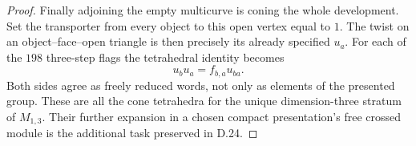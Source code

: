 \begin{proof}
Finally adjoining the empty multicurve is coning the
whole development.  Set the transporter from every
object to this open vertex equal to $1$.  The twist
on an object--face--open triangle is then precisely
its already specified $u_a$.  For each of the $198$
three-step flags the tetrahedral identity becomes
\[
                       u_bu_a=f_{b,a}u_{ba}.
\]
Both sides agree as freely reduced words, not only as
elements of the presented group.  These are all the
cone tetrahedra for the unique dimension-three
stratum of $M_{1,3}$.  Their further expansion in a
chosen compact presentation's free crossed module
is the additional task preserved in D.24.
\end{proof}
